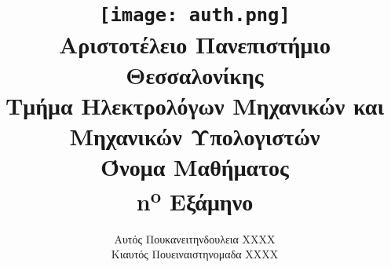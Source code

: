 \title{
	\texttt{[image: auth.png]}\\
	\large{Αριστοτέλειο Πανεπιστήμιο Θεσσαλονίκης}\\
	\large{Τμήμα Ηλεκτρολόγων Μηχανικών και Μηχανικών Υπολογιστών}\\
	\vspace{2cm}
	\LARGE{Όνομα Μαθήματος}\\
	\vspace{0.5cm}
	\large{n\textsuperscript{o} Εξάμηνο}
	\vspace{3cm}
}

\author{
	Αυτός Πουκανειτηνδουλεια XXXX\\
	Κιαυτός Πουειναιστηνομαδα XXXX
	\vspace{3cm}
}
